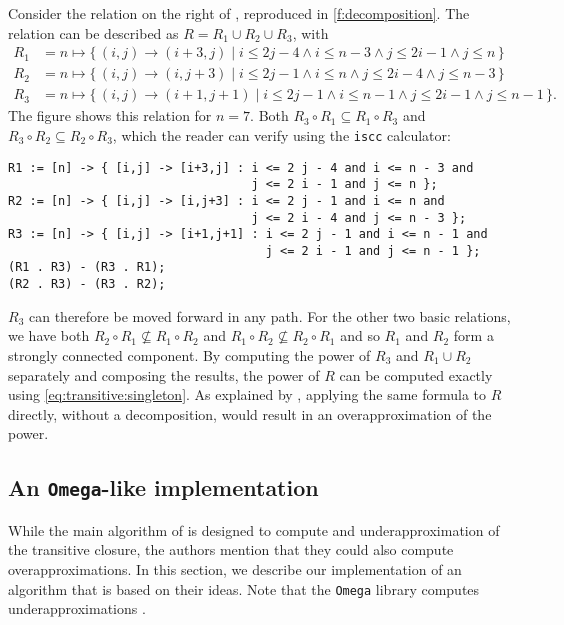 \begin{example}
\label{ex:decomposition}
Consider the relation on the right of ,
reproduced in \autoref{f:decomposition}.
The relation can be described as $R = R_1 \cup R_2 \cup R_3$,
with
$$
\begin{aligned}
R_1 &= n \mapsto \{\, (i,j) \to (i+3,j) \mid
i \le 2 j - 4 \wedge
i \le n - 3 \wedge
j \le 2 i - 1 \wedge
j \le n \,\}
\\
R_2 &= n \mapsto \{\, (i,j) \to (i,j+3) \mid
i \le 2 j - 1 \wedge
i \le n \wedge
j \le 2 i - 4 \wedge
j \le n - 3 \,\}
\\
R_3 &= n \mapsto \{\, (i,j) \to (i+1,j+1) \mid
i \le 2 j - 1 \wedge
i \le n - 1 \wedge
j \le 2 i - 1 \wedge
j \le n - 1\,\}
.
\end{aligned}
$$
The figure shows this relation for $n = 7$.
Both
$R_3 \circ R_1 \subseteq R_1 \circ R_3$
and
$R_3 \circ R_2 \subseteq R_2 \circ R_3$,
which the reader can verify using the {\tt iscc} calculator:
\begin{verbatim}
R1 := [n] -> { [i,j] -> [i+3,j] : i <= 2 j - 4 and i <= n - 3 and
                                  j <= 2 i - 1 and j <= n };
R2 := [n] -> { [i,j] -> [i,j+3] : i <= 2 j - 1 and i <= n and
                                  j <= 2 i - 4 and j <= n - 3 };
R3 := [n] -> { [i,j] -> [i+1,j+1] : i <= 2 j - 1 and i <= n - 1 and
                                    j <= 2 i - 1 and j <= n - 1 };
(R1 . R3) - (R3 . R1);
(R2 . R3) - (R3 . R2);
\end{verbatim}
$R_3$ can therefore be moved forward in any path.
For the other two basic relations, we have both
$R_2 \circ R_1 \not\subseteq R_1 \circ R_2$
and
$R_1 \circ R_2 \not\subseteq R_2 \circ R_1$
and so $R_1$ and $R_2$ form a strongly connected component.
By computing the power of $R_3$ and $R_1 \cup R_2$ separately
and composing the results, the power of $R$ can be computed exactly
using \eqref{eq:transitive:singleton}.
As explained by , applying the same formula
to $R$ directly, without a decomposition, would result in
an overapproximation of the power.
\end{example}

\subsection{An {\tt Omega}-like implementation}

While the main algorithm of  is
designed to compute and underapproximation of the transitive closure,
the authors mention that they could also compute overapproximations.
In this section, we describe our implementation of an algorithm
that is based on their ideas.
Note that the {\tt Omega} library computes underapproximations
.

